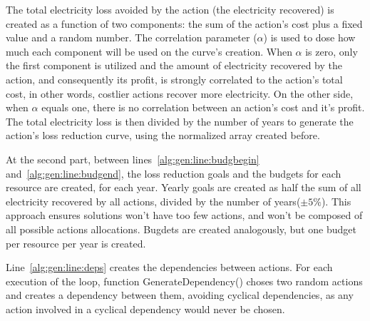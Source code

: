 The total electricity loss avoided by the action (the electricity recovered) is created as a function of two components: the sum of the action's
cost plus a fixed value and a random number. The correlation parameter ($\alpha$) is used to dose how much each component will be used on the curve's 
creation. When $\alpha$ is zero, only the first component is utilized and the amount of electricity recovered by the action, and consequently its profit,
is strongly correlated to the action's total cost, in other words, costlier actions recover more electricity. On the other side, when $\alpha$ equals
one, there is no correlation between an action's cost and it's profit. The total electricity loss is then divided by the number of years to generate the 
action's loss reduction curve, using the normalized array created before.



At the second part, between lines~\ref{alg:gen:line:budgbegin} and~\ref{alg:gen:line:budgend}, the loss reduction goals and the budgets for
each resource are created, for each year. Yearly goals are created as half the sum of all electricity recovered by all actions, divided 
by the number of years($\pm5\%$). This approach ensures solutions won't have too few actions, and won't be composed of all possible 
actions allocations. Bugdets are created analogously, but one budget per resource per year is created.

Line~\ref{alg:gen:line:deps} creates the dependencies between actions. For each execution of the loop, function GenerateDependency() 
choses two random actions and creates a dependency between them, avoiding cyclical dependencies, as any action involved in a cyclical 
dependency would never be chosen.

